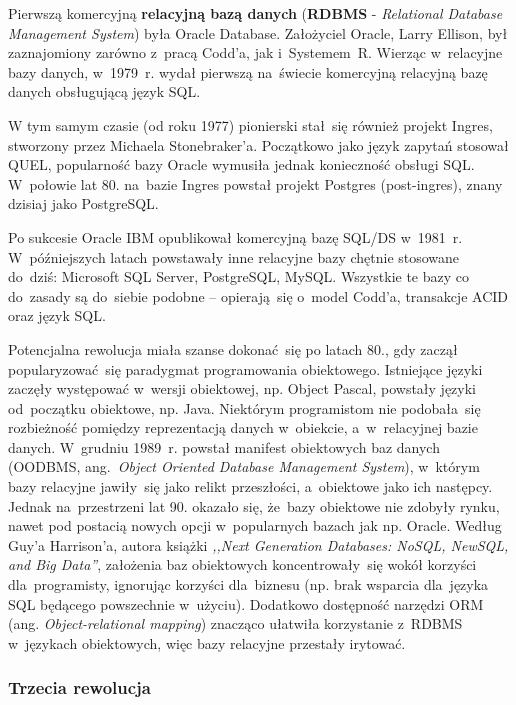 \documentclass[12pt,a4paper,twoside,titlepage,openright]{book}
\begin{document}
Pierwszą komercyjną \textbf{relacyjną bazą danych} (\textbf{RDBMS} - \textit{Relational Database Management System}) była Oracle Database. Założyciel Oracle, Larry Ellison, był zaznajomiony zarówno z~pracą Codd'a, jak i~Systemem~R. Wierząc w~relacyjne bazy danych, w~1979~r. wydał pierwszą na~świecie komercyjną relacyjną bazę danych obsługującą język SQL. \cite{relationalDbs}

W tym samym czasie (od roku 1977) pionierski stał~się również projekt Ingres, stworzony przez Michaela Stonebraker'a. Początkowo jako język zapytań stosował QUEL, popularność bazy Oracle wymusiła jednak konieczność obsługi SQL. W~połowie lat 80. na~bazie Ingres powstał projekt Postgres (post-ingres), znany dzisiaj jako PostgreSQL. 

Po sukcesie Oracle IBM opublikował komercyjną bazę SQL/DS w~1981~r. W~późniejszych latach powstawały inne relacyjne bazy chętnie stosowane do~dziś: Microsoft SQL Server, PostgreSQL, MySQL. Wszystkie te bazy co do~zasady są do~siebie podobne -- opierają~się o~model Codd'a, transakcje ACID oraz język SQL. \cite{relationalDbs}

Potencjalna rewolucja miała szanse dokonać~się po latach 80., gdy zaczął popularyzować~się paradygmat programowania obiektowego. Istniejące języki zaczęły występować w~wersji obiektowej, np. Object Pascal, powstały języki od~początku obiektowe, np. Java. Niektórym programistom nie podobała~się rozbieżność pomiędzy reprezentacją danych w~obiekcie, a~w~relacyjnej bazie danych. W~grudniu 1989~r. powstał manifest obiektowych baz danych (OODBMS, ang.~\textit{Object Oriented Database Management System}), w~którym bazy relacyjne jawiły~się jako relikt przeszłości, a~obiektowe jako ich następcy.\cite{oodbmsManifesto} Jednak na~przestrzeni lat 90. okazało się, że~bazy obiektowe nie zdobyły rynku, nawet pod postacią nowych opcji w~popularnych bazach jak np. Oracle. Według Guy'a Harrison'a, autora książki \textit{,,Next Generation Databases: NoSQL, NewSQL, and Big Data''}, założenia baz obiektowych koncentrowały~się wokół korzyści dla~programisty, ignorując korzyści dla~biznesu (np. brak wsparcia dla~języka SQL będącego powszechnie w~użyciu). Dodatkowo dostępność narzędzi ORM (ang. \textit{Object-relational mapping}) znacząco ułatwiła korzystanie z~RDBMS w~językach obiektowych, więc bazy relacyjne przestały irytować.

\subsubsection{Trzecia rewolucja}
\end{document}
